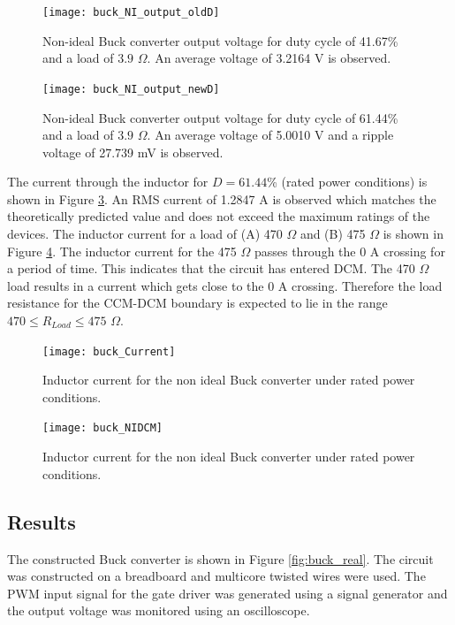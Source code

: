 \documentclass[12pt,twoside]{scrartcl}
\begin{document}
\begin{figure}[h]
    \centering
    \texttt{[image: buck\_NI\_output\_oldD]}
    \caption{Non-ideal Buck converter output voltage for duty cycle of 41.67\% and a load of $3.9$ $\Omega$. An average voltage of 3.2164 V is observed.}
    \label{fig:buck_NI_output_oldD}
\end{figure}
\begin{figure}[h]
    \centering
    \texttt{[image: buck\_NI\_output\_newD]}
    \caption{Non-ideal Buck converter output voltage for duty cycle of 61.44\% and a load of $3.9$ $\Omega$. An average voltage of 5.0010 V and a ripple voltage of 27.739 mV is observed.}
    \label{fig:buck_NI_output_newD}
\end{figure}
\pagebreak

\noindent The current through the inductor for $D = 61.44$\% (rated power conditions) is shown in Figure \ref{fig:buck_Current}. An RMS current of 1.2847 A is observed which matches the theoretically predicted value and does not exceed the maximum ratings of the devices. The inductor current for a load of (A) 470 $\Omega$ and (B) 475 $\Omega$ is shown in Figure \ref{fig:buck_NIDCM}. The inductor current for the 475 $\Omega$ passes through the 0 A crossing for a period of time. This indicates that the circuit has entered DCM. The 470 $\Omega$ load results in a current which gets close to the 0 A crossing. Therefore the load resistance for the CCM-DCM boundary is expected to lie in the range $470 \le R_{Load} \le 475$ $\Omega$. \par
\newpage

\begin{figure}[h]
    \centering
    \texttt{[image: buck\_Current]}
    \caption{Inductor current for the non ideal Buck converter under rated power conditions.}
    \label{fig:buck_Current}
\end{figure}

\begin{figure}[h!]
    \centering
    \texttt{[image: buck\_NIDCM]}
    \caption{Inductor current for the non ideal Buck converter under rated power conditions.}
    \label{fig:buck_NIDCM}
\end{figure}

\subsection{Results}
The constructed Buck converter is shown in Figure \ref{fig:buck_real}. The circuit was constructed on a breadboard and multicore twisted wires were used. The PWM input signal for the gate driver was generated using a signal generator and the output voltage was monitored using an oscilloscope. \par
\end{document}
